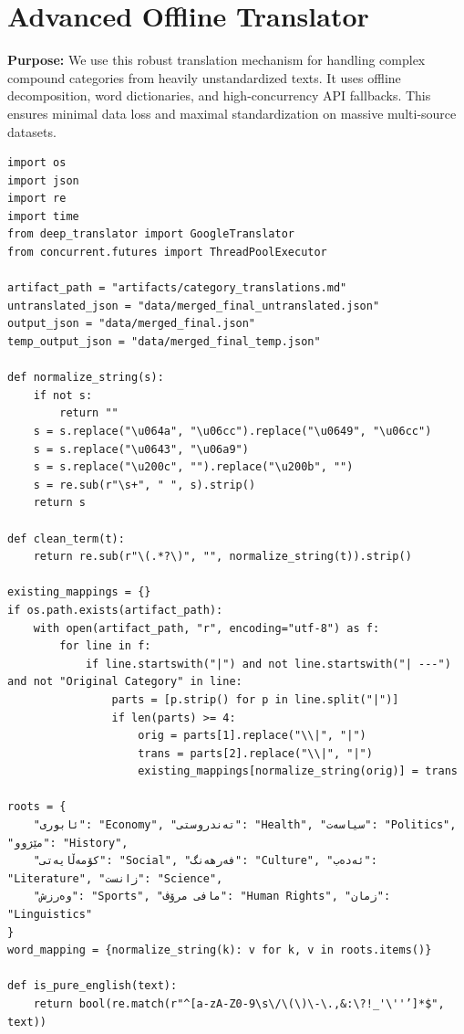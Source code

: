 \documentclass[11pt]{article}
\begin{document}
\section{Advanced Offline Translator} \label{sec:advancedtranslator}
\textbf{Purpose:} We use this robust translation mechanism for handling complex compound categories from heavily unstandardized texts. It uses offline decomposition, word dictionaries, and high-concurrency API fallbacks. This ensures minimal data loss and maximal standardization on massive multi-source datasets.

\begin{lstlisting}[style=pythoncode, caption={advanced\_translator.py}]
import os
import json
import re
import time
from deep_translator import GoogleTranslator
from concurrent.futures import ThreadPoolExecutor

artifact_path = "artifacts/category_translations.md"
untranslated_json = "data/merged_final_untranslated.json"
output_json = "data/merged_final.json"
temp_output_json = "data/merged_final_temp.json"

def normalize_string(s):
    if not s:
        return ""
    s = s.replace("\u064a", "\u06cc").replace("\u0649", "\u06cc")
    s = s.replace("\u0643", "\u06a9")
    s = s.replace("\u200c", "").replace("\u200b", "")
    s = re.sub(r"\s+", " ", s).strip()
    return s

def clean_term(t):
    return re.sub(r"\(.*?\)", "", normalize_string(t)).strip()

existing_mappings = {}
if os.path.exists(artifact_path):
    with open(artifact_path, "r", encoding="utf-8") as f:
        for line in f:
            if line.startswith("|") and not line.startswith("| ---") and not "Original Category" in line:
                parts = [p.strip() for p in line.split("|")]
                if len(parts) >= 4:
                    orig = parts[1].replace("\\|", "|")
                    trans = parts[2].replace("\\|", "|")
                    existing_mappings[normalize_string(orig)] = trans

roots = {
    "ئابوری": "Economy", "تەندروستی": "Health", "سیاسەت": "Politics", "مێژوو": "History",
    "کۆمەڵایەتی": "Social", "فەرهەنگ": "Culture", "ئەدەب": "Literature", "زانست": "Science",
    "وەرزش": "Sports", "مافی مرۆڤ": "Human Rights", "زمان": "Linguistics"
}
word_mapping = {normalize_string(k): v for k, v in roots.items()}

def is_pure_english(text):
    return bool(re.match(r"^[a-zA-Z0-9\s\/\(\)\-\.,&:\?!_'\''’]*$", text))


\end{lstlisting}
\end{document}
